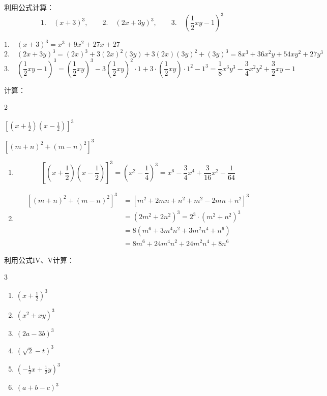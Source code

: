 \begin{example}
    利用公式计算：
\[1.\quad(x+3)^3,\qquad 2.\quad(2x+3y)^3,\qquad 3.\quad\left(\frac{1}{2}xy-1\right)^3 \]
\end{example}

\begin{solution}
$1.\quad(x+3)^3=x^3+9x^2+27x+27$
\[
   2.\quad (2x+3y)^3=(2x)^3 +3(2x)^2(3y)+3(2x)(3y)^2+(3y)^3
    =8x^3+36x^2y+54xy^2+27y^3
\]
\[
     3.\quad\left(\frac{1}{2}xy-1\right)^3
    = \left(\frac{1}{2}xy\right)^3 -3\left(\frac{1}{2}xy\right)^2\cdot 1+3\cdot \left(\frac{1}{2}xy\right)\cdot 1^2-1^3
    =\frac{1}{8}x^3y^3-\frac{3}{4}x^2y^2+\frac{3}{2}xy-1
\]

\end{solution}

\begin{example}
    计算：
    \begin{enumerate}
        \begin{multicols}{2}
               \item \quad $\left[\left(x+\frac{1}{2}\right)\left(x-\frac{1}{2}\right)\right]^3$
        \item \quad $\left[(m+n)^2+(m-n)^2\right]^3$
        \end{multicols}
    \end{enumerate}
\end{example}


\begin{solution}
\begin{enumerate}
    \item \[
        \left[\left(x+\frac{1}{2}\right)\left(x-\frac{1}{2}\right)\right]^3=\left(x^2-\frac{1}{4}\right)^3
        =x^6-\frac{3}{4}x^4+\frac{3}{16}x^2-\frac{1}{64}        
    \]
    \item \[\begin{split}
        \left[(m+n)^2+(m-n)^2\right]^3&=\left[m^2+2mn+n^2+m^2-2mn+n^2\right]^3\\
        &=(2m^2+2n^2)^3=2^3\cdot (m^2+n^2)^3\\
        &=8(m^6+3m^4n^2+3m^2n^4+n^6)\\
        &=8m^6+24m^4n^2+24m^2n^4+8n^6
    \end{split}\]
\end{enumerate}
\end{solution}

\begin{ex}
利用公式IV、V计算：
   \begin{multicols}{3}
\begin{enumerate}
    \item $\left(x+\frac{1}{2}\right)^3$
    \item $(x^2+xy)^3$
    \item $(2a-3b)^3$
    \item $\left(\sqrt{2}-t\right)^3$
    \item $\left(-\frac{1}{2}x+\frac{1}{2}y\right)^3$
    \item $(a+b-c)^3$
\end{enumerate}   
    \end{multicols}
\end{ex}

